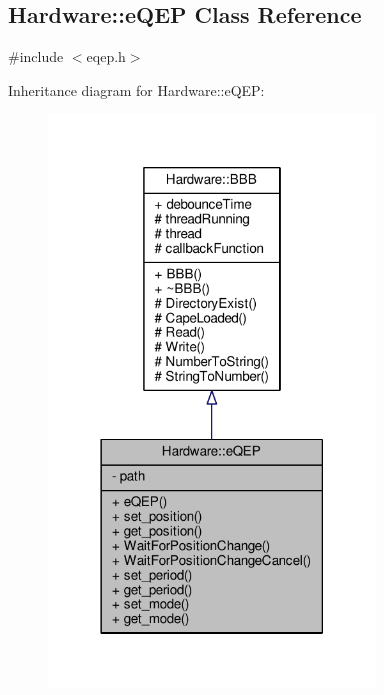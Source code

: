 \hypertarget{class_hardware_1_1e_q_e_p}{}\subsection{Hardware\+:\+:e\+Q\+E\+P Class Reference}
\label{class_hardware_1_1e_q_e_p}


{\ttfamily \#include $<$eqep.\+h$>$}



Inheritance diagram for Hardware\+:\+:e\+Q\+E\+P\+:
\nopagebreak
\begin{figure}[H]
\begin{center}
\leavevmode
\includegraphics[width=246pt]{class_hardware_1_1e_q_e_p__inherit__graph}
\end{center}
\end{figure}


